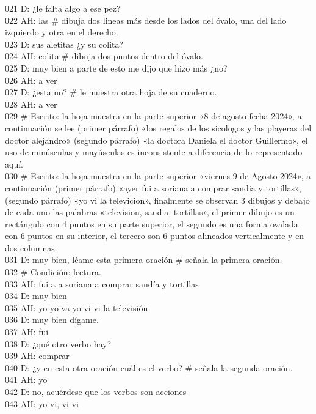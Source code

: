 021 D: ¿le falta algo a ese pez?\\
022 AH: las \# dibuja dos lineas más desde los lados del óvalo, una del lado izquierdo y otra en el derecho.\\
023 D: sus aletitas ¿y su colita?\\
024 AH: colita \# dibuja dos puntos dentro del óvalo.\\
025 D: muy bien a parte de esto me dijo que hizo más ¿no?\\
026 AH: a ver\\
027 D: ¿esta no? \# le muestra otra hoja de su cuaderno.\\
028 AH: a ver\\
029 \# Escrito: la hoja muestra en la parte superior «8 de agosto fecha 2024», a continuación se lee (primer párrafo) «los regalos de los sicologos y las playeras del doctor alejandro» (segundo párrafo) «la doctora Daniela el doctor Guillermo», el uso de minúsculas y mayúsculas es inconsistente a diferencia de lo representado aquí.\\
030 \# Escrito: la hoja muestra en la parte superior «viernes 9  de Agosto 2024», a continuación (primer párrafo) «ayer fui a soriana a comprar sandia y tortillas», (segundo párrafo) «yo vi la televicion», finalmente se observan 3 dibujos y debajo de cada uno las palabras «television, sandia, tortillas», el primer dibujo es un rectángulo con 4 puntos en su parte superior, el segundo es una forma ovalada con 6 puntos en su interior, el tercero son 6 puntos alineados verticalmente y en dos columnas.\\
031 D: muy bien, léame esta primera oración \# señala la primera oración.\\
032 \# Condición: lectura.\\
033 AH: fui a a soriana a comprar sandía y tortillas\\
034 D: muy bien\\
035 AH: yo yo va yo vi vi la televisión\\
036 D: muy bien dígame.\\
037 AH: fui\\
038 D: ¿qué otro verbo hay?\\
039 AH: comprar\\
040 D: ¿y en esta otra oración cuál es el verbo? \# señala la segunda oración.\\
041 AH: yo\\
042 D: no, acuérdese que los verbos son acciones\\
043 AH: yo vi, vi vi\\
